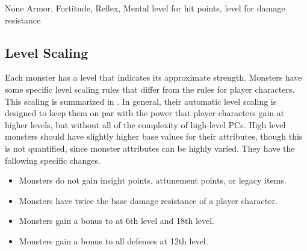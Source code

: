              None
              Armor,  Fortitude,  Reflex,  Mental
              level for hit points,  level for damage resistance

    \subsection{Level Scaling}
        Each monster has a level that indicates its approximate strength.
        Monsters have some specific level scaling rules that differ from the rules for player characters.
        This scaling is summarized in .
        In general, their automatic level scaling is designed to keep them on par with the power that player characters gain at higher levels, but without all of the complexity of high-level PCs.
        High level monsters should have slightly higher base values for their attributes, though this is not quantified, since monster attributes can be highly varied.
        They have the following specific changes.
        \begin{itemize}
            \item Monsters do not gain insight points, attunement points, or legacy items.
            \item Monsters have twice the base damage resistance of a player character.
            \item Monsters gain a  bonus to  at 6th level and 18th level.
            \item Monsters gain a  bonus to all defenses at 12th level.
        \end{itemize}

